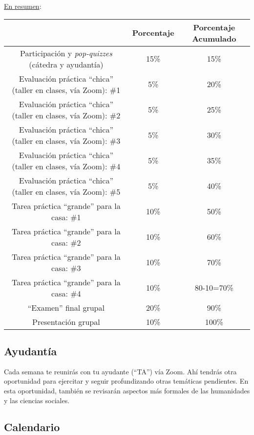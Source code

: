 \documentclass[letterpaper]{article}
\begin{document}
\underline{En resumen}:

\begin{table}[h]
\begin{tabular}{ccc}
							& \textbf{Porcentaje} & {\bf Porcentaje Acumulado} \\
							\hline
Participaci\'on y \emph{pop-quizzes} (c\'atedra y ayudant\'ia) & 15\%       & 15\%                 \\
\hline
Evaluaci\'on pr\'actica ``chica'' (taller en clases, v\'ia Zoom): \#1 & 5\% & 20\%                 \\
Evaluaci\'on pr\'actica ``chica'' (taller en clases, v\'ia Zoom): \#2 & 5\% & 25\%                 \\
Evaluaci\'on pr\'actica ``chica'' (taller en clases, v\'ia Zoom): \#3 & 5\% & 30\%                 \\
Evaluaci\'on pr\'actica ``chica'' (taller en clases, v\'ia Zoom): \#4 & 5\% & 35\%                 \\
Evaluaci\'on pr\'actica ``chica'' (taller en clases, v\'ia Zoom): \#5 & 5\% & 40\%  \\
\hline
Tarea pr\'actica ``grande'' para la casa: \#1 	 & 10\% & 50\%    \\
Tarea pr\'actica ``grande'' para la casa: \#2 	 & 10\% & 60\%    \\
Tarea pr\'actica ``grande'' para la casa: \#3 	 & 10\% & 70\%    \\
Tarea pr\'actica ``grande'' para la casa: \#4   & 10\% & 80-10=70\%    \\
\hline
``Examen'' final grupal & 20\% & 90\% \\
Presentaci\'on grupal & 10\% & 100\% \\
\hline             
\end{tabular}
\end{table}

\subsection*{Ayudant\'ia}

Cada semana te reunir\'as con tu ayudante (``TA'') v\'ia Zoom. Ah\'i tendr\'as otra oportunidad para ejercitar y seguir profundizando otras tem\'aticas pendientes. En esta oportunidad, tambi\'en se revisar\'an aspectos m\'as formales de las humanidades y las ciencias sociales. 

\subsection*{Calendario}
\end{document}
